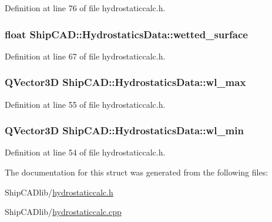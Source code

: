 Definition at line 76 of file hydrostaticcalc.\+h.

\subsubsection[{\texorpdfstring{wetted\+\_\+surface}{wetted_surface}}]{\setlength{\rightskip}{0pt plus 5cm}float Ship\+C\+A\+D\+::\+Hydrostatics\+Data\+::wetted\+\_\+surface}\hypertarget{structShipCAD_1_1HydrostaticsData_ad4b78176732ea80000adb94b5b5669f3}{}\label{structShipCAD_1_1HydrostaticsData_ad4b78176732ea80000adb94b5b5669f3}


Definition at line 67 of file hydrostaticcalc.\+h.

\subsubsection[{\texorpdfstring{wl\+\_\+max}{wl_max}}]{\setlength{\rightskip}{0pt plus 5cm}Q\+Vector3D Ship\+C\+A\+D\+::\+Hydrostatics\+Data\+::wl\+\_\+max}\hypertarget{structShipCAD_1_1HydrostaticsData_a332be807e8373521c238d82b9dcedc38}{}\label{structShipCAD_1_1HydrostaticsData_a332be807e8373521c238d82b9dcedc38}


Definition at line 55 of file hydrostaticcalc.\+h.

\subsubsection[{\texorpdfstring{wl\+\_\+min}{wl_min}}]{\setlength{\rightskip}{0pt plus 5cm}Q\+Vector3D Ship\+C\+A\+D\+::\+Hydrostatics\+Data\+::wl\+\_\+min}\hypertarget{structShipCAD_1_1HydrostaticsData_a3bb2750b6306d9e8ae09bb4eebb1ed0c}{}\label{structShipCAD_1_1HydrostaticsData_a3bb2750b6306d9e8ae09bb4eebb1ed0c}


Definition at line 54 of file hydrostaticcalc.\+h.



The documentation for this struct was generated from the following files\+:\begin{DoxyCompactItemize}
\item 
Ship\+C\+A\+Dlib/\hyperlink{hydrostaticcalc_8h}{hydrostaticcalc.\+h}\item 
Ship\+C\+A\+Dlib/\hyperlink{hydrostaticcalc_8cpp}{hydrostaticcalc.\+cpp}\end{DoxyCompactItemize}
